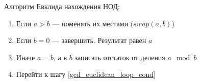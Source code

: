 Алгоритм Евклида нахождения НОД:
\begin{enumerate}
 \item Если $a>b$ --- поменять их местами ($swap(a, b)$)
 \item \label{gcd_euclidean_loop_cond} Если $b=0$ --- завершить. Результат равен $a$
 \item Иначе $a = b$, а в $b$ записать отстаток от деления $a \mod b$
 \item Перейти к шагу \ref{gcd_euclidean_loop_cond}
\end{enumerate}
